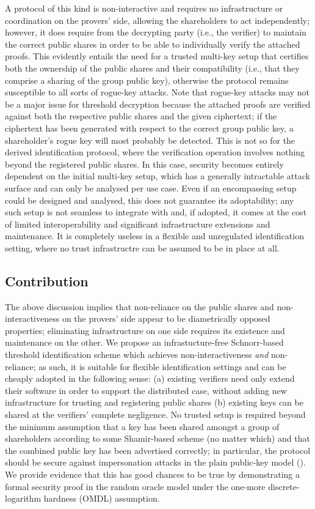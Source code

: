 \documentclass{iacrtrans}
\begin{document}
A protocol of this kind is non-interactive and requires
no infrastructure or coordination on the provers' side,
allowing the shareholders to act independently; however,
it does require from the decrypting party (i.e., the verifier)
to maintain the correct public shares
in order to be able to individually verify the attached proofs.
This evidently entails the need for a trusted multi-key setup
that certifies both the ownership of the public shares
and their compatibility (i.e., that they
comprise a sharing of the group public key),
otherwise the protocol remains susceptible
to all sorts of rogue-key attacks.
Note that rogue-key attacks may not be a major issue
for threshold decryption because the attached
proofs are verified against both the respective public shares
and the given ciphertext; if the ciphertext has been generated
with respect to the correct group public key,
a shareholder's rogue key will
most probably be detected. This is not so for the derived
identification protocol,
where the verification operation involves nothing
beyond the registered public shares.
In this case, security becomes
entirely dependent on the initial multi-key setup,
which has a generally intractable attack surface
and can only be analysed per use case.
Even if an encompassing setup
could be designed and analysed,
this does not guarantee its adoptability;
any such setup is not seamless to integrate with and,
if adopted, it comes at the cost of limited interoperability
and significant infrastructure extensions and maintenance.
It is completely useless
in a flexible and unregulated identification setting,
where no trust infrastructre can be assumed to be
in place at all.

\subsection{Contribution}\label{section_contribution}
The above discussion implies
that non-reliance on the public shares
and non-interactiveness on the provers' side appear to be
diametrically opposed properties;
eliminating infrastructure on one side
requires its existence and maintenance on the other.
We propose an infrastucture-free
Schnorr-based threshold identification scheme
which achieves non-interactiveness \textit{and} non-reliance;
as such, it is suitable for flexible identification
settings and can be cheaply adopted
in the following sense: (a) existing verifiers
need only extend their software
in order to support the distributed case,
without adding new infrastructure
for trusting and registering
public shares (b) existing keys
can be shared at the verifiers' complete negligence.
No trusted setup is required beyond
the minimum assumption that a key has been
shared amongst a group of shareholders according to some
Shamir-based scheme (no matter which)
and that the combined public key has been advertised
correctly; in particular,
the protocol should be secure against
impersonation attacks in the plain public-key model
(\cite{paper_bellare_musig}).
We provide evidence that this has good chances to be true
by demonstrating a formal security proof in the random oracle model
under the one-more discrete-logarithm hardness (OMDL) assumption.
\end{document}
